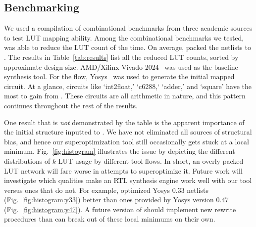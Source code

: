 \subsection{Benchmarking}\label{sec:results:benchmark}

We used a compilation of \nbenchmarks{} combinational benchmarks from three
academic sources to test LUT mapping ability. Among the combinational
benchmarks we tested, \shortname{} was able to reduce the LUT count \fmetric{}
of the time. On average, \shortname{} packed the netlists to \metric{}. The
results in Table~\ref{tab:results} list all the reduced LUT counts, sorted by
approximate design size. AMD/Xilinx Vivado 2024~\cite{vivado} was used as the
baseline synthesis tool. For the \shortname{} flow, Yosys~\cite{yosys} was used
to generate the initial mapped circuit. At a glance, circuits like `int2float,'
`c6288,` `adder,' and `square' have the most to gain from \shortname{}. These
circuits are all arithmetic in nature, and this pattern continues throughout
the rest of the results.

One result that is \textit{not} demonstrated by the table is the apparent
importance of the initial structure inputted to \shortname{}. We have not
eliminated all sources of structural bias, and hence our superoptimization tool
still occasionally gets stuck at a local minimum. Fig.~\ref{fig:histogram}
illustrates the issue by depicting the different distributions of $k$-LUT usage
by different tool flows. In short, an overly packed LUT network will fare worse
in attempts to superoptimize it. Future work will investigate which qualities
make an RTL synthesis engine work well with our tool versus ones that do not.
For example, \shortname{} optimized Yosys 0.33 netlists
(Fig.~\ref{fig:histogram:y33}) better than ones provided by Yosys version 0.47
(Fig.~\ref{fig:histogram:y47}). A future version of \shortname{} should
implement new rewrite procedures than can break out of these local minimums on
their own.

